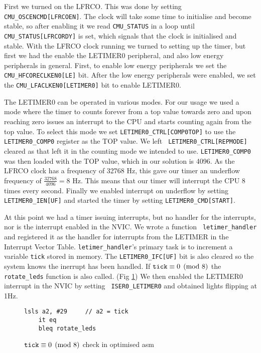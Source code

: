 First we turned on the LFRCO. This was done by setting {\tt
CMU\_OSCENCMD[LFRCOEN]}. The clock will take some time to initialise and become
stable, so after enabling it we read {\tt CMU\_STATUS} in a loop until {\tt
CMU\_STATUS[LFRCORDY]} is set, which signals that the clock is initialised and
stable. With the LFRCO clock running we turned to setting up the timer, but
first we had the enable the LETIMER0 peripheral, and also low energy peripherals
in general. First, to enable low energy peripherals we set the {\tt
CMU\_HFCORECLKEN0[LE]} bit. After the low energy peripherals were enabled, we
set the {\tt CMU\_LFACLKEN0[LETIMER0]} bit to enable LETIMER0.

The LETIMER0 can be operated in various modes. For our usage we used a mode
where the timer to counts forever from a top value towards zero and upon
reaching zero issues an interrupt to the CPU and starts counting again from the
top value. To select this mode we set {\tt LETIMER0\_CTRL[COMP0TOP]} to use the
{\tt LETIMER0\_COMP0} register as the TOP value. We left {\tt
LETIMER0\_CTRL[REPMODE]} cleared as that left it in the counting mode we
intended to use. {\tt LETIMER0\_COMP0} was then loaded with the TOP value, which
in our solution is 4096. As the LFRCO clock has a frequency of 32768 Hz, this
gave our timer an underflow frequency of \( \frac{32768}{4096} = 8 \) Hz. This
means that our timer will interrupt the CPU 8 times every second. Finally we
enabled interrupt on underflow by setting {\tt LETIMER0\_IEN[UF]} and started
the timer by setting {\tt LETIMER0\_CMD[START]}.

At this point we had a timer issuing interrupts, but no handler for the
interrupts, nor is the interrupt enabled in the NVIC. We wrote a function {\tt
letimer\_handler} and registered it as the handler for interrupts from the
LETIMER in the Interrupt Vector Table. {\tt letimer\_handler}'s primary task is
to increment a variable {\tt tick} stored in memory. The {\tt LETIMER0\_IFC[UF]}
bit is also cleared so the system knows the inerrupt has been handled. If \(
{\tt tick} \equiv 0 \pmod 8 \) the {\tt rotate\_leds} function is also called.
(Fig \ref{code:mod})
We then enabled the LETIMER0 interrupt in the NVIC by setting {\tt
ISER0\_LETIMER0} and obtained lights flipping at 1Hz.

\begin{figure}[h]
	\caption{\( {\tt tick} \equiv 0 \pmod 8 \) check in optimised asm}
	\label{code:mod}
	\begin{lstlisting}[frame=single]
	lsls a2, #29     // a2 = tick
	it eq
	bleq rotate_leds
	\end{lstlisting}
\end{figure}


